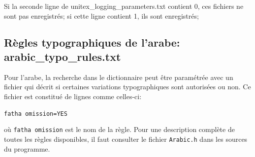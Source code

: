Si la seconde ligne de unitex\_logging\_parameters.txt contient 0, ces fichiers ne sont pas
enregistrés; si cette ligne contient 1, ils sont enregistrés;

\subsection{Règles typographiques de l'arabe: arabic\_typo\_rules.txt}
\label{subsection-arabic-typo-rules}
Pour l'arabe, la recherche dans le dictionnaire peut être paramétrée avec un fichier qui décrit si
certaines variations typographiques sont autorisées ou non. Ce fichier est constitué de lignes comme
celles-ci:

\bigskip
\noindent \verb+fatha omission=YES+

\bigskip
\noindent où \verb+fatha omission+ est le nom de la règle. Pour une description complète de toutes
les règles disponibles, il faut consulter le fichier \verb+Arabic.h+ dans les sources du programme.


